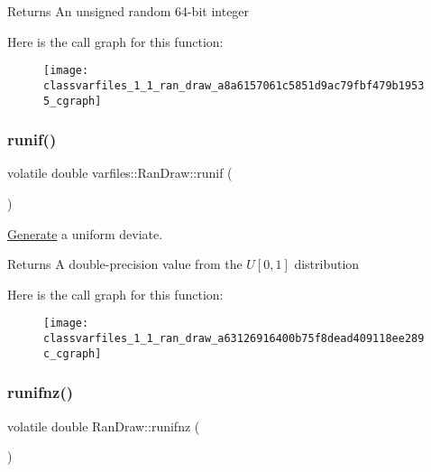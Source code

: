 \begin{DoxyReturn}{Returns}
An unsigned random 64-\/bit integer 
\end{DoxyReturn}
Here is the call graph for this function\+:\nopagebreak
\begin{figure}[H]
\begin{center}
\leavevmode
\texttt{[image: classvarfiles\_1\_1\_ran\_draw\_a8a6157061c5851d9ac79fbf479b19535\_cgraph]}
\end{center}
\end{figure}
\mbox{\label{classvarfiles_1_1_ran_draw_a63126916400b75f8dead409118ee289c}} 
\subsubsection{\texorpdfstring{runif()}{runif()}}
{\footnotesize\ttfamily volatile double varfiles\+::\+Ran\+Draw\+::runif (\begin{DoxyParamCaption}{ }\end{DoxyParamCaption})\hspace{0.3cm}{\ttfamily [inline]}}



\hyperlink{classvarfiles_1_1_generate}{Generate} a uniform deviate. 

\begin{DoxyReturn}{Returns}
A double-\/precision value from the $ U[0,1]$ distribution 
\end{DoxyReturn}
Here is the call graph for this function\+:\nopagebreak
\begin{figure}[H]
\begin{center}
\leavevmode
\texttt{[image: classvarfiles\_1\_1\_ran\_draw\_a63126916400b75f8dead409118ee289c\_cgraph]}
\end{center}
\end{figure}
\mbox{\label{classvarfiles_1_1_ran_draw_a5688bd202e487435398b1c1cb6f9ce30}} 
\subsubsection{\texorpdfstring{runifnz()}{runifnz()}}
{\footnotesize\ttfamily volatile double Ran\+Draw\+::runifnz (\begin{DoxyParamCaption}{ }\end{DoxyParamCaption})}



